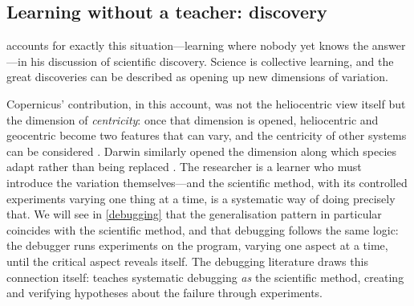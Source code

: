 \subsection{Learning without a teacher: discovery}

\Textcite[Ch.~5]{NCOL} accounts for exactly this situation---learning where
nobody yet knows the answer---in his discussion of scientific discovery.
Science is collective learning, and the great discoveries can be described as
opening up new dimensions of variation.


Copernicus' contribution, in this account, was not the heliocentric view
itself but the dimension of \emph{centricity}: once that dimension is opened,
heliocentric and geocentric become two features that can vary, and the
centricity of other systems can be considered \autocite[pp.~155--156]{NCOL}.
Darwin similarly opened the dimension along which species adapt rather than
being replaced \autocite[pp.~157--160]{NCOL}.
The researcher is a learner who must introduce the variation themselves---and the scientific method, with its controlled experiments varying one thing
at a time, is a systematic way of doing precisely that.
We will see in \cref{debugging} that the generalisation pattern in particular
coincides with the scientific method, and that debugging follows the same
logic: the debugger runs experiments on the program, varying one aspect at a
time, until the critical aspect reveals itself.
The debugging literature draws this connection itself:
\textcite{WhyProgramsFail} teaches systematic debugging \emph{as} the
scientific method, creating and verifying hypotheses about the failure
through experiments.

